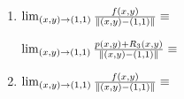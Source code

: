 \documentclass[../practica_05.tex]{subfiles}
\begin{document}
    \begin{enumerate}
        \item $\lim_{(x,y)\to(1,1)} \frac{f(x,y)}{\norm*{(x,y)-(1,1)}} \equiv$
        
            $\lim_{(x,y)\to(1,1)} \frac{p(x,y) + R_3(x,y)}{\norm*{(x,y)-(1,1)}} \equiv$

        \item $\lim_{(x,y)\to(1,1)} \frac{f(x,y)}{\norm*{(x,y)-(1,1)}} \equiv$
    \end{enumerate}
\end{document}
